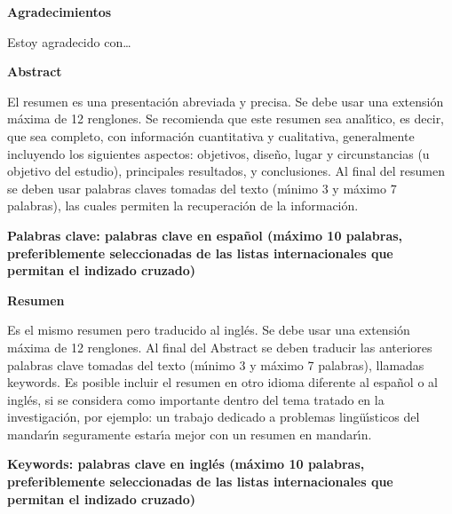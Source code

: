 \newpage

\thispagestyle{empty}

\vspace*{1cm}

\textbf{\LARGE Agradecimientos}\vspace*{1.0cm}

Estoy agradecido con\ldots

\newpage{\pagestyle{empty}\cleardoublepage}

\newpage

\vspace*{1cm}

\textbf{\LARGE Abstract}\vspace*{1cm}

El resumen es una presentaci\'{o}n abreviada y precisa. Se debe usar una extensi\'{o}n m\'{a}xima de 12 renglones. Se recomienda que este resumen sea anal\'{\i}tico, es decir, que sea completo, con informaci\'{o}n cuantitativa y cualitativa, generalmente incluyendo los siguientes aspectos: objetivos, dise\~{n}o, lugar y circunstancias (u objetivo del estudio), principales resultados, y conclusiones. Al final del resumen se deben usar palabras claves tomadas del texto (m\'{\i}nimo 3 y m\'{a}ximo 7 palabras), las cuales permiten la recuperaci\'{o}n de la informaci\'{o}n.\vspace*{0.5cm}

\textbf{\small Palabras clave: palabras clave en espa\~{n}ol (m\'{a}ximo 10 palabras, preferiblemente seleccionadas de las listas internacionales que permitan el indizado cruzado)}\vspace*{1cm}

\textbf{\LARGE Resumen}\vspace*{1cm}

Es el mismo resumen pero traducido al ingl\'{e}s. Se debe usar una extensi\'{o}n m\'{a}xima de 12 renglones. Al final del Abstract se deben traducir las anteriores palabras clave tomadas del texto (m\'{\i}nimo 3 y m\'{a}ximo 7 palabras), llamadas keywords. Es posible incluir el resumen en otro idioma diferente al espa\~{n}ol o al ingl\'{e}s, si se considera como importante dentro del tema tratado en la investigaci\'{o}n, por ejemplo: un trabajo dedicado a problemas ling\"{u}\'{\i}sticos del mandar\'{\i}n seguramente estar\'{\i}a mejor con un resumen en mandar\'{\i}n.\vspace*{0.5cm}

\textbf{\small Keywords: palabras clave en ingl\'{e}s (m\'{a}ximo 10 palabras, preferiblemente seleccionadas de las listas internacionales que permitan el indizado cruzado)}

\newpage{\pagestyle{empty}\cleardoublepage}